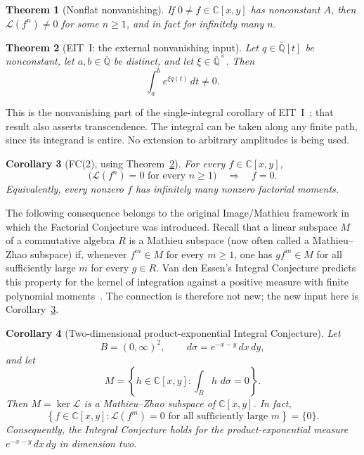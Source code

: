 \documentclass[11pt]{article}
\numberwithin{equation}{section}
\newtheorem{theorem}{Theorem}[section]
\newtheorem{corollary}[theorem]{Corollary}
\theoremstyle{definition}\newtheorem{definition}[theorem]{Definition}
\theoremstyle{remark}\newtheorem{remark}[theorem]{Remark}
\newcommand{\C}{\mathbb C}
\newcommand{\Qb}{\overline{\mathbb Q}}
\newcommand{\Lfac}{\mathcal L}
\newcommand{\dd}{\,d}
\begin{document}
\begin{theorem}[Nonflat nonvanishing]\label{thm:nonflat}
If $0\ne f\in\C[x,y]$ has nonconstant $A$, then $\Lfac(f^n)\ne0$ for some
$n\ge1$, and in fact for infinitely many $n$.
\end{theorem}

\begin{theorem}[EIT~I: the external nonvanishing input]\label{thm:eit}
Let $q\in\Qb[t]$ be nonconstant, let $a,b\in\Qb$ be distinct, and let
$\xi\in\Qb^\times$. Then
\[
 \int_a^b e^{\xi q(t)}\dd t\ne0.
\]
\end{theorem}
This is the nonvanishing part of the single-integral corollary of
EIT~I~\cite[Corollary~1.4, source label \texttt{cor:single}]{EIT};
that result also asserts
transcendence. The integral can be taken along any finite path, since its
integrand is entire. No extension to arbitrary amplitudes is being used.

\begin{corollary}[FC(2), using Theorem~\ref{thm:eit}]\label{cor:fc2}
For every $f\in\C[x,y]$,
\[
 \bigl(\Lfac(f^n)=0\text{ for every }n\ge1\bigr)\quad\Longrightarrow\quad f=0.
\]
Equivalently, every nonzero $f$ has infinitely many nonzero factorial moments.
\end{corollary}

The following consequence belongs to the original Image/Mathieu framework
in which the Factorial Conjecture was introduced. Recall that a linear
subspace $M$ of a commutative algebra $R$ is a Mathieu subspace (now
often called a Mathieu--Zhao subspace) if,
whenever $f^m\in M$ for every $m\ge1$, one has $gf^m\in M$ for all
sufficiently large $m$ for every $g\in R$. Van den Essen's Integral
Conjecture predicts this property for the kernel of integration against a
positive measure with finite polynomial moments~\cite{AmazingImage}.
The connection is therefore not new; the new input here is
Corollary~\ref{cor:fc2}.

\begin{corollary}[Two-dimensional product-exponential Integral Conjecture]
\label{cor:integral-mathieu}
Let
\[
 B=(0,\infty)^2,\qquad
 \dd\sigma=e^{-x-y}\dd x\dd y,
\]
and let
\[
 M=\left\{h\in\C[x,y]:
       \int_B h\,\dd\sigma=0\right\}.
\]
Then $M=\ker\Lfac$ is a Mathieu--Zhao subspace of $\C[x,y]$. In fact,
\[
 \left\{f\in\C[x,y]:
   \Lfac(f^m)=0\text{ for all sufficiently large }m\right\}=\{0\}.
\]
Consequently, the Integral Conjecture holds for the product-exponential
measure $e^{-x-y}\dd x\dd y$ in dimension two.
\end{corollary}
\end{document}

